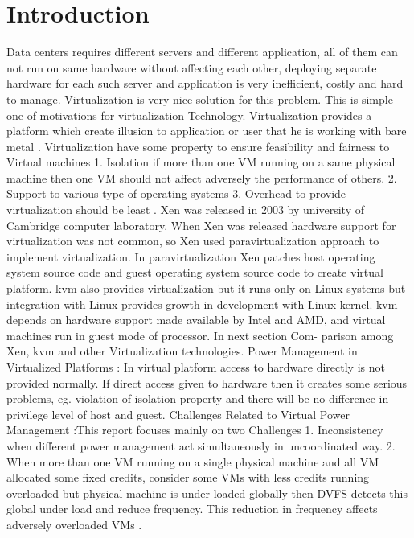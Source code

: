 \documentclass[seminar,twoside]{iitbreport}
\begin{document}
%
%
%
%

\section {Introduction}
Data centers requires different servers and different application, all of them can
not run on same hardware without affecting each other, deploying separate 
hardware for each such server and application is very inefficient, costly and hard
to manage. Virtualization is very nice solution for this problem. This is simple one of 
motivations for virtualization Technology. Virtualization provides a platform
which create illusion to application or user that he is working with bare metal .
Virtualization have some property to ensure feasibility and fairness to Virtual machines 
1. Isolation if more than one VM running on a same physical machine then one
VM should not affect adversely the performance of others. 
2. Support to various type of operating systems 
3. Overhead to provide virtualization should be least \cite{xen}. 
Xen was released in 2003 by university of Cambridge computer laboratory.
When Xen was released hardware support for virtualization was not common, 
so Xen used paravirtualization approach to implement virtualization. 
In paravirtualization Xen patches host operating system source code and guest operating
system source code to create virtual platform. kvm also provides virtualization but it 
runs only on Linux systems but integration with Linux provides growth in
development with Linux kernel. kvm depends on hardware support made available by Intel
and AMD, and virtual machines run in guest mode of processor.\cite{kvm} In next section Com-
parison among Xen, kvm and other Virtualization technologies. Power Management in
Virtualized Platforms : In virtual platform access to hardware directly is not provided
normally. If direct access given to hardware then it creates some serious problems, eg. 
violation of isolation property and there will be no difference in privilege level of host
and guest. Challenges Related to Virtual Power Management :This report
focuses mainly on two Challenges 1. Inconsistency when different power management act
simultaneously in uncoordinated way. \cite{nostruggle} 2. When more than one VM running on a single
physical machine and all VM allocated some fixed credits, consider some VMs with
less credits running overloaded but physical machine is under loaded globally then DVFS
detects this global under load and reduce frequency. This reduction in frequency affects
adversely overloaded VMs \cite{dvfs}.
\end{document}
